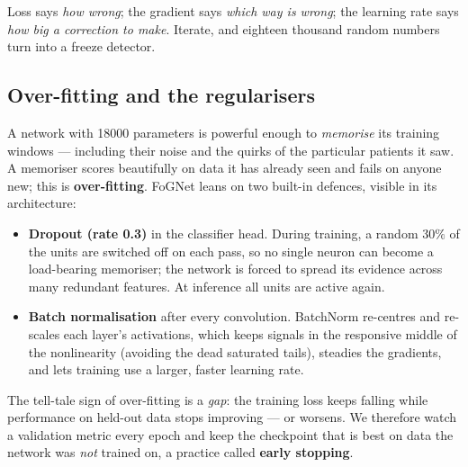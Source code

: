 \begin{takeaway}
Loss says \emph{how wrong}; the gradient says \emph{which way is wrong}; the learning
rate says \emph{how big a correction to make}. Iterate, and eighteen thousand random
numbers turn into a freeze detector.
\end{takeaway}

\subsection{Over-fitting and the regularisers}

A network with \num{18000} parameters is powerful enough to \emph{memorise} its training
windows --- including their noise and the quirks of the particular patients it saw.
A memoriser scores beautifully on data it has already seen and fails on anyone new;
this is \textbf{over-fitting}. FoGNet leans on two built-in defences, visible in its
architecture:
\begin{itemize}
  \item \textbf{Dropout (rate 0.3)} in the classifier head. During training, a random
  $30\%$ of the units are switched off on each pass, so no single neuron can become a
  load-bearing memoriser; the network is forced to spread its evidence across many
  redundant features. At inference all units are active again.
  \item \textbf{Batch normalisation} after every convolution. BatchNorm re-centres and
  re-scales each layer's activations, which keeps signals in the responsive middle of
  the nonlinearity (avoiding the dead saturated tails), steadies the gradients, and
  lets training use a larger, faster learning rate.
\end{itemize}
The tell-tale sign of over-fitting is a \emph{gap}: the training loss keeps falling
while performance on held-out data stops improving --- or worsens. We therefore watch a
validation metric every epoch and keep the checkpoint that is best on data the network
was \emph{not} trained on, a practice called \textbf{early stopping}.

